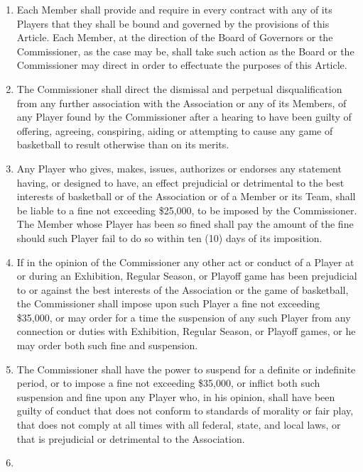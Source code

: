 \documentclass[
]{book}
\providecommand{\tightlist}{%
  \setlength{\itemsep}{0pt}\setlength{\parskip}{0pt}}
\begin{document}
\begin{enumerate}
  \begin{enumerate}
  \def\labelenumii{(\alph{enumii})}
  \tightlist
  \item
    Each Member shall provide and require in every contract with any of its Players that they shall be bound and governed by the provisions of this Article. Each Member, at the direction of the Board of Governors or the Commissioner, as the case may be, shall take such action as the Board or the Commissioner may direct in order to effectuate the purposes of this Article.
  \item
    The Commissioner shall direct the dismissal and perpetual disqualification from any further association with the Association or any of its Members, of any Player found by the Commissioner after a hearing to have been guilty of offering, agreeing, conspiring, aiding or attempting to cause any game of basketball to result otherwise than on its merits.
  \item
    Any Player who gives, makes, issues, authorizes or endorses any statement having, or designed to have, an effect prejudicial or detrimental to the best interests of basketball or of the Association or of a Member or its Team, shall be liable to a fine not exceeding \$25,000, to be imposed by the Commissioner. The Member whose Player has been so fined shall pay the amount of the fine should such Player fail to do so within ten (10) days of its imposition.
  \item
    If in the opinion of the Commissioner any other act or conduct of a Player at or during an Exhibition, Regular Season, or Playoff game has been prejudicial to or against the best interests of the Association or the game of basketball, the Commissioner shall impose upon such Player a fine not exceeding \$35,000, or may order for a time the suspension of any such Player from any connection or duties with Exhibition, Regular Season, or Playoff games, or he may order both such fine and suspension.
  \item
    The Commissioner shall have the power to suspend for a definite or indefinite period, or to impose a fine not exceeding \$35,000, or inflict both such suspension and fine upon any Player who, in his opinion, shall have been guilty of conduct that does not conform to standards of morality or fair play, that does not comply at all times with all federal, state, and local laws, or that is prejudicial or detrimental to the Association.
  \item

\end{enumerate}
\end{enumerate}
\end{document}
